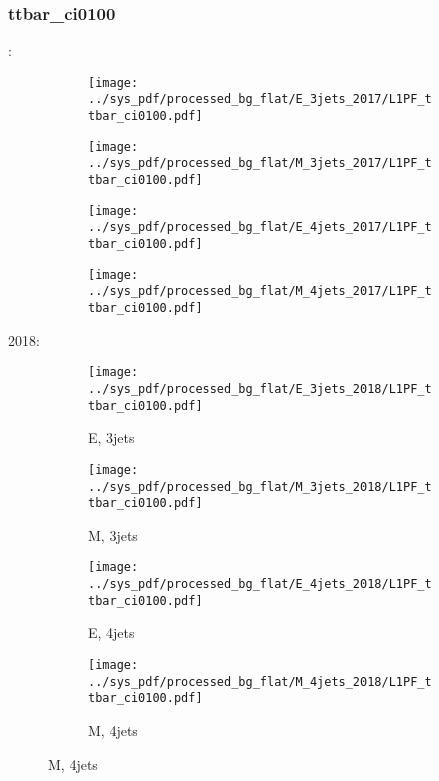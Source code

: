 \documentclass{beamer}
\begin{document}
\begin{frame}
\frametitle{ttbar_ci0100}
\fontsize{5}{1}:
\begin{figure}
\centering
\begin{subfigure}[b]{0.24\textwidth}
\texttt{[image: ../sys\_pdf/processed\_bg\_flat/E\_3jets\_2017/L1PF\_ttbar\_ci0100.pdf]}
\end{subfigure}
\begin{subfigure}[b]{0.24\textwidth}
\texttt{[image: ../sys\_pdf/processed\_bg\_flat/M\_3jets\_2017/L1PF\_ttbar\_ci0100.pdf]}
\end{subfigure}
\begin{subfigure}[b]{0.24\textwidth}
\texttt{[image: ../sys\_pdf/processed\_bg\_flat/E\_4jets\_2017/L1PF\_ttbar\_ci0100.pdf]}
\end{subfigure}
\begin{subfigure}[b]{0.24\textwidth}
\texttt{[image: ../sys\_pdf/processed\_bg\_flat/M\_4jets\_2017/L1PF\_ttbar\_ci0100.pdf]}
\end{subfigure}
\end{figure}
2018:
\begin{figure}
\centering
\begin{subfigure}[b]{0.24\textwidth}
\texttt{[image: ../sys\_pdf/processed\_bg\_flat/E\_3jets\_2018/L1PF\_ttbar\_ci0100.pdf]}
\captionsetup{font=tiny}
\caption{E, 3jets}
\end{subfigure}
\begin{subfigure}[b]{0.24\textwidth}
\texttt{[image: ../sys\_pdf/processed\_bg\_flat/M\_3jets\_2018/L1PF\_ttbar\_ci0100.pdf]}
\captionsetup{font=tiny}
\caption{M, 3jets}
\end{subfigure}
\begin{subfigure}[b]{0.24\textwidth}
\texttt{[image: ../sys\_pdf/processed\_bg\_flat/E\_4jets\_2018/L1PF\_ttbar\_ci0100.pdf]}
\captionsetup{font=tiny}
\caption{E, 4jets}
\end{subfigure}
\begin{subfigure}[b]{0.24\textwidth}
\texttt{[image: ../sys\_pdf/processed\_bg\_flat/M\_4jets\_2018/L1PF\_ttbar\_ci0100.pdf]}
\captionsetup{font=tiny}
\caption{M, 4jets}
\end{subfigure}
\end{figure}
\end{frame}
\end{document}
